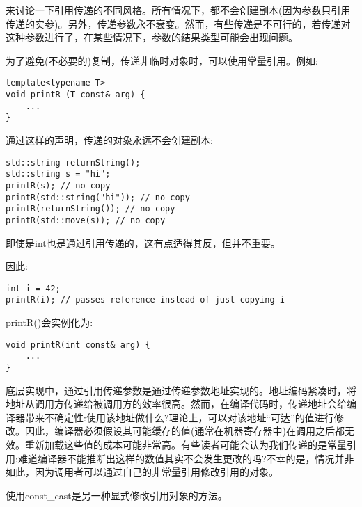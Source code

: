 
来讨论一下引用传递的不同风格。所有情况下，都不会创建副本(因为参数只引用传递的实参)。另外，传递参数永不衰变。然而，有些传递是不可行的，若传递对这种参数进行了，在某些情况下，参数的结果类型可能会出现问题。


为了避免(不必要的)复制，传递非临时对象时，可以使用常量引用。例如:

\begin{lstlisting}[style=styleCXX]
template<typename T>
void printR (T const& arg) {
	...
}
\end{lstlisting}

通过这样的声明，传递的对象永远不会创建副本:

\begin{lstlisting}[style=styleCXX]
std::string returnString();
std::string s = "hi";
printR(s); // no copy
printR(std::string("hi")); // no copy
printR(returnString()); // no copy
printR(std::move(s)); // no copy
\end{lstlisting}

即使是int也是通过引用传递的，这有点适得其反，但并不重要。

因此:

\begin{lstlisting}[style=styleCXX]
int i = 42;
printR(i); // passes reference instead of just copying i
\end{lstlisting}

printR()会实例化为:

\begin{lstlisting}[style=styleCXX]
void printR(int const& arg) {
	...
}
\end{lstlisting}

底层实现中，通过引用传递参数是通过传递参数地址实现的。地址编码紧凑时，将地址从调用方传递给被调用方的效率很高。然而，在编译代码时，传递地址会给编译器带来不确定性:使用该地址做什么?理论上，可以对该地址“可达”的值进行修改。因此，编译器必须假设其可能缓存的值(通常在机器寄存器中)在调用之后都无效。重新加载这些值的成本可能非常高。有些读者可能会认为我们传递的是常量引用:难道编译器不能推断出这样的数值其实不会发生更改的吗?不幸的是，情况并非如此，因为调用者可以通过自己的非常量引用修改引用的对象。

\begin{tcolorbox}[colback=webgreen!5!white,colframe=webgreen!75!black]
\hspace*{0.75cm}使用const\_cast是另一种显式修改引用对象的方法。
\end{tcolorbox}

